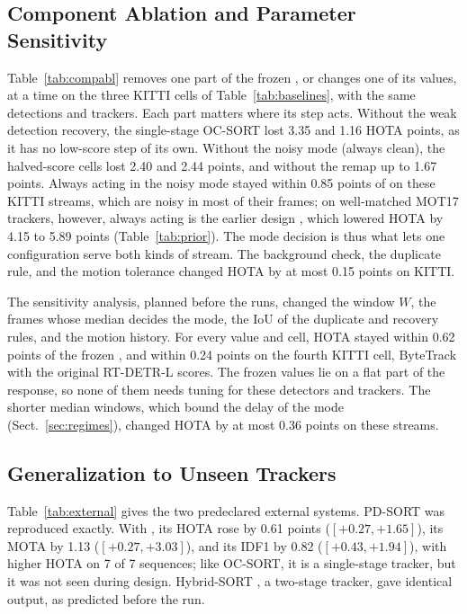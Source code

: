 \subsection{Component Ablation and Parameter Sensitivity}\label{sec:ablation}
Table~\ref{tab:compabl} removes one part of the frozen \scl{}, or changes one of its values, at a
time on the three KITTI cells of Table~\ref{tab:baselines}, with the same detections and trackers.
Each part matters where its step acts. Without the weak detection recovery, the single-stage
OC-SORT lost 3.35 and 1.16 HOTA points, as it has no low-score step of its own. Without the noisy
mode (always clean), the halved-score cells lost 2.40 and 2.44 points, and without the remap up to
1.67 points. Always acting in the noisy mode stayed within 0.85 points of \scl{} on these KITTI
streams, which are noisy in most of their frames; on well-matched MOT17 trackers, however, always
acting is the earlier design \aob{}, which lowered HOTA by 4.15 to 5.89 points
(Table~\ref{tab:prior}). The mode decision is thus what lets one configuration serve both kinds of
stream. The background check, the duplicate rule, and the motion tolerance changed HOTA by at most
0.15 points on KITTI.

The sensitivity analysis, planned before the runs, changed the window $W$, the frames whose median
decides the mode, the IoU of the duplicate and recovery rules, and the motion history. For every
value and cell, HOTA stayed within 0.62 points of the frozen \scl{}, and within 0.24 points on the
fourth KITTI cell, ByteTrack with the original RT-DETR-L scores. The frozen values lie on a flat
part of the response, so none of them needs tuning for these detectors and trackers. The shorter
median windows, which bound the delay of the mode (Sect.~\ref{sec:regimes}), changed HOTA by at most
0.36 points on these streams.


\subsection{Generalization to Unseen Trackers}\label{sec:external}
Table~\ref{tab:external} gives the two predeclared external systems. PD-SORT \cite{wang2025pdsort}
was reproduced exactly. With \scl{}, its HOTA rose by 0.61 points ($[+0.27,+1.65]$), its MOTA by
1.13 ($[+0.27,+3.03]$), and its IDF1 by 0.82 ($[+0.43,+1.94]$), with higher HOTA on 7 of 7
sequences; like OC-SORT, it is a single-stage tracker, but it was not seen during design.
Hybrid-SORT \cite{yang2024hybridsort}, a two-stage tracker, gave identical output, as predicted
before the run.


